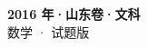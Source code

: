\documentclass[zihao=-4, a4paper]{ctexart}
\begin{document}
\begin{center}
  {\Large\bfseries 2016 年·山东卷·文科}\\[4pt]
  {\large 数学 · 试题版}
\end{center}
\medskip
{}

\end{document}
